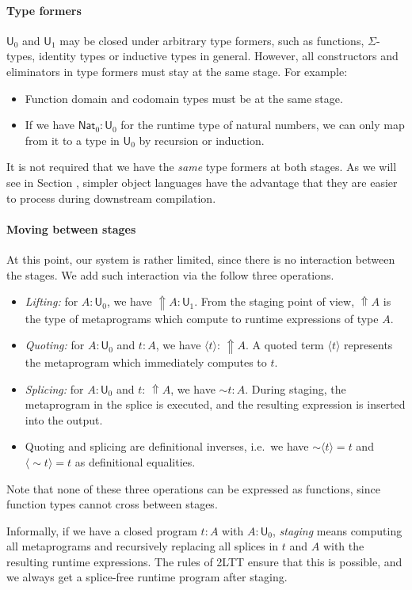 \documentclass[acmsmall]{acmart}
\newcommand{\msf}[1]{\mathsf{#1}}
\newcommand{\Lift}{{\Uparrow}}
\newcommand{\spl}{{\sim}}
\newcommand{\qut}[1]{\langle #1\rangle}
\renewcommand{\U}{\msf{U}}
\newcommand{\Nat}{\msf{Nat}}
\theoremstyle{remark}
\begin{document}
\paragraph{Type formers} $\U_0$ and $\U_1$ may be closed under arbitrary type formers,
such as functions, $\Sigma$-types, identity types or inductive types in general.
However, all constructors and eliminators in type formers must stay at the same
stage. For example:
\begin{itemize}
  \item Function domain and codomain types must be at the same stage.
  \item If we have $\Nat_0 : \U_0$ for the runtime type of natural numbers,
        we can only map from it to a type in $\U_0$ by recursion or induction.
\end{itemize}
It is not required that we have the \emph{same} type formers at both stages. As we will
see in Section \cite{TODO}, simpler object languages have the advantage that they are
easier to process during downstream compilation.

\paragraph{Moving between stages} At this point, our system is rather limited, since
there is no interaction between the stages. We add such interaction via the follow
three operations.
\begin{itemize}
\item \emph{Lifting:} for $A : \U_0$, we have $\Lift A : \U_1$.  From the
  staging point of view, $\Lift A$ is the type of metaprograms which compute
  to runtime expressions of type $A$.
\item \emph{Quoting:} for $A : \U_0$ and $t : A$, we have $\qut{t} :\,\Lift A$.
  A quoted term $\qut{t}$ represents the metaprogram which immediately computes
  to $t$.
\item \emph{Splicing:} for $A : \U_0$ and $t :\,\Lift A$, we have $\spl t : A$.
  During staging, the metaprogram in the splice is executed, and the resulting
  expression is inserted into the output.
\item Quoting and splicing are definitional inverses, i.e.\ we have $\spl\qut{t} = t$ and
  $\qut{\spl t}=t$ as definitional equalities.
\end{itemize}
Note that none of these three operations can be expressed as functions, since
function types cannot cross between stages.

Informally, if we have a closed program $t : A$ with $A : \U_0$, \emph{staging}
means computing all metaprograms and recursively replacing all splices in $t$ and $A$
with the resulting runtime expressions. The rules of 2LTT ensure that this is possible,
and we always get a splice-free runtime program after staging.
\end{document}
